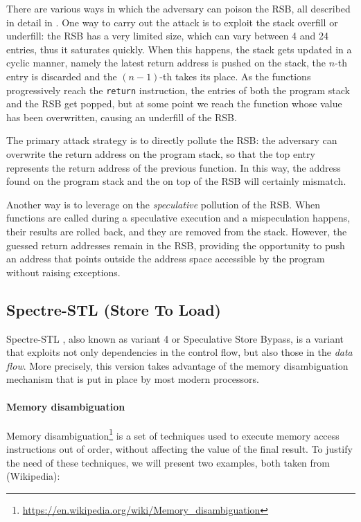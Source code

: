 \documentclass[12pt,a4paper]{book}
\theoremstyle{definition}
\begin{document}
	There are various ways in which the adversary can poison the RSB, all described in detail in \cite{Koruyeh2018}. One way to carry out the attack is to exploit the stack overfill or underfill: the RSB has a very limited size, which can vary between 4 and 24 entries, thus it saturates quickly. When this happens, the stack gets updated in a cyclic manner, namely the latest return address is pushed on the stack, the $n$-th entry is discarded and the $(n-1)$-th takes its place. As the functions progressively reach the \texttt{return} instruction, the entries of both the program stack and the RSB get popped, but at some point we reach the function whose value has been overwritten, causing an underfill of the RSB.
	
	The primary attack strategy is to directly pollute the RSB: the adversary can overwrite the return address on the program stack, so that the top entry represents the return address of the previous function. In this way, the address found on the program stack and the on top of the RSB will certainly mismatch. 
	
	Another way is to leverage on the \textit{speculative} pollution of the RSB. When functions are called during a speculative execution and a mispeculation happens, their results are rolled back, and they are removed from the stack. However, the guessed return addresses remain in the RSB, providing the opportunity to push an address that points outside the address space accessible by the program without raising exceptions.
	
	\subsection{Spectre-STL (Store To Load)}\label{sec:spectre-stl}
	Spectre-STL \cite{Canella2019}, also known as variant 4 or Speculative Store Bypass, is a variant that exploits not only dependencies in the control flow, but also those in the \textit{data flow}. More precisely, this version takes advantage of the memory disambiguation mechanism that is put in place by most modern processors.
	
	\paragraph{Memory disambiguation} Memory disambiguation\footnote{\url{https://en.wikipedia.org/wiki/Memory_disambiguation}} is a set of techniques used to execute memory access instructions out of order, without affecting the value of the final result. To justify the need of these techniques, we will present two examples, both taken from (Wikipedia):
	
\end{document}
